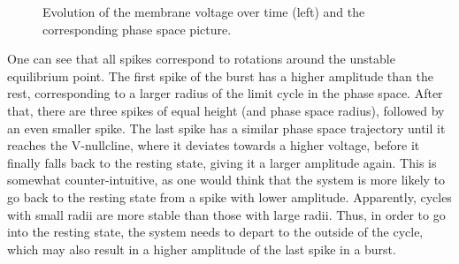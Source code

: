 \documentclass[12pt,a4paper]{article}
\begin{document}
\begin{figure}[H]
\hspace*{-0.5cm}

\caption{Evolution of the membrane voltage over time (left) and the corresponding phase space picture.}
\label{ppcompneur}
\end{figure}
One can see that all spikes correspond to rotations around the unstable equilibrium point. The first spike of the burst has a higher amplitude than the rest, corresponding to a larger radius of the limit cycle in the phase space. After that, there are three spikes of equal height (and phase space radius), followed by an even smaller spike. The last spike has a similar phase space trajectory until it reaches the V-nullcline, where it deviates towards a higher voltage, before it finally falls back to the resting state, giving it a larger amplitude again. This is somewhat counter-intuitive, as one would think that the system is more likely to go back to the resting state from a spike with lower amplitude. Apparently, cycles with small radii are more stable than those with large radii. Thus, in order to go into the resting state, the system needs to depart to the outside of the cycle, which may also result in a higher amplitude of the last spike in a burst.\\
\end{document}
